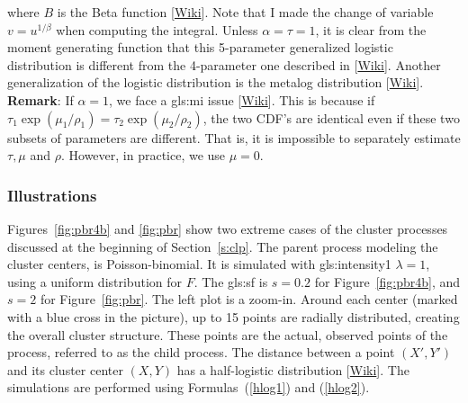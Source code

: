 \documentclass[10pt]{article}
\begin{document}
where $B$ is the \textcolor{index}{Beta function} [\href{https://en.wikipedia.org/wiki/Beta_function}{Wiki}]. Note that I made the change of variable $v=u^{1/\beta}$ when computing the integral. Unless $\alpha=\tau=1$, it is clear from the moment generating function that this 5-parameter \textcolor{index}{generalized logistic distribution}  is different from the
4-parameter one described in [\href{https://en.wikipedia.org/wiki/Generalized_logistic_distribution}{Wiki}]. Another generalization of the logistic distribution is the
\textcolor{index}{metalog distribution} [\href{https://en.wikipedia.org/wiki/Metalog_distribution}{Wiki}].\vspace{1ex} \\
{\bf Remark}: If $\alpha=1$, we face a
\gls{gls:mi} %
 issue [\href{https://en.wikipedia.org/wiki/Identifiability}{Wiki}]. This is because if $\tau_1\exp(\mu_1/\rho_1)=\tau_2\exp(\mu_2/\rho_2)$, the two CDF's are identical even if these two subsets of parameters are different. That is, it is impossible to separately estimate $\tau,\mu$ and $\rho$. However, in practice, we use $\mu=0$.


\subsubsection{Illustrations}\label{illus}

Figures~\ref{fig:pbr4b} and \ref{fig:pbr} show two extreme cases of the cluster processes discussed at the beginning of Section~\ref{s:clp}. The parent process modeling the cluster centers, is Poisson-binomial. It is simulated with  \gls{gls:intensity1} $\lambda=1$, using a uniform distribution for $F$. The \gls{gls:sf} is $s=0.2$ for Figure~\ref{fig:pbr4b}, and
$s=2$ for Figure~\ref{fig:pbr}. The left plot is a zoom-in. Around each center (marked with a blue cross in the picture), up to 15 points are radially distributed, creating the overall cluster structure. These points are the actual, observed points of the process, referred to as the child process.
The distance between a point $(X', Y')$ and its cluster center $(X,Y)$
has a \textcolor{index}{half-logistic distribution}
[\href{https://en.wikipedia.org/wiki/Half-logistic_distribution}{Wiki}]. The simulations are performed
using Formulas~(\ref{hlog1}) and (\ref{hlog2}).
\end{document}

